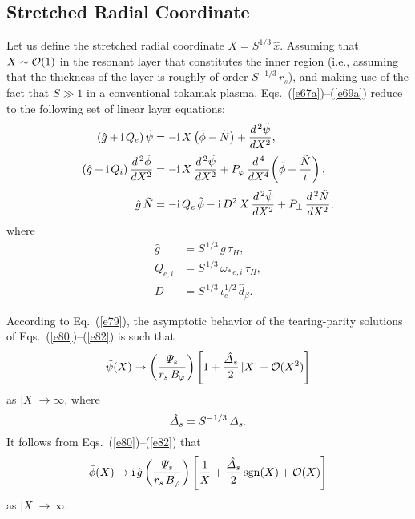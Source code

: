 \documentclass[12pt,prb,aps,notitlepage]{revtex4-1}
\begin{document}
\subsection{Stretched Radial Coordinate}
Let us define the stretched radial coordinate $X = S^{1/3}\,\hat{x}$.
Assuming that $X\sim{\cal O}(1)$ in the resonant layer that constitutes the inner region (i.e., assuming that the thickness of the layer is roughly of order $S^{-1/3}\,r_s$),
and making use of the fact that $S\gg 1$ in a conventional tokamak plasma,  Eqs.~(\ref{e67a})--(\ref{e69a}) reduce to the following
set of linear layer equations:
\begin{align}\label{e80}
(\hat{g}+{\rm i}\,Q_{e})\,\tilde{\psi}&= - {\rm i}\,X\left(\tilde{\phi}-\tilde{N}\right) + \frac{d^{\,2}\tilde{\psi}}{d X^2},\\[0.5ex]
(\hat{g}+{\rm i}\,Q_i)\,\frac{d^{\,2}\tilde{\phi}}{d X^2}&= - {\rm i}\,X\,\frac{d^{\,2}\tilde{\psi}}{d X^2}+ P_\varphi\,\frac{d^{\,4}}{d X^4}\!\left(\tilde{\phi} + \frac{\tilde{N}}{\iota}\right),\\[0.5ex]
\hat{g}\,\tilde{N} &= - {\rm i}\,Q_{e}\,\tilde{\phi}  - {\rm i} \,D^{2}\,X\,\frac{d^{\,2}\tilde{\psi}}{d X^{2}}
+ P_\perp\,\frac{d^{\,2} \tilde{N}}{d X^{2}},\label{e82}
\end{align}
where 
\begin{align}
\hat{g}& = S^{\,1/3}\,g\,\tau_H, \\[0.5ex]
Q_{e,i} &= S^{\,1/3}\,\omega_{\ast\,e,i}\,\tau_H,\\[0.5ex]
D &= S^{\,1/3}\,\iota_e^{1/2}\,\hat{d}_\beta.
\end{align} 

According to Eq.~(\ref{e79}), the asymptotic behavior of the tearing-parity solutions of Eqs.~(\ref{e80})--(\ref{e82}) is
such that
\begin{equation}\label{e47}
\tilde{\psi}(X)\rightarrow  \left(\frac{{\mit\Psi}_s}{r_s\,B_\varphi}\right)\left[1+ \frac{\hat{\mit\Delta}_s}{2}\,|X| + {\cal O}(X^2)\right]
\end{equation}
as $|X|\rightarrow\infty$, where
\begin{equation}\label{e84}
\hat{\mit\Delta}_s = S^{-1/3}\,{\mit\Delta}_s.
\end{equation}
It follows from Eqs.~(\ref{e80})--(\ref{e82}) that
\begin{equation}\label{e85}
\bar{\phi}(X)\rightarrow {\rm i}\,\hat{g}\left(\frac{{\mit\Psi}_s}{r_s\,B_\varphi}\right)\left[\frac{1}{X}+ \frac{\hat{\mit\Delta}_s}{2}\,{\rm sgn}(X) + {\cal O}(X)\right]
\end{equation}
as $|X|\rightarrow\infty$. 
\end{document}
